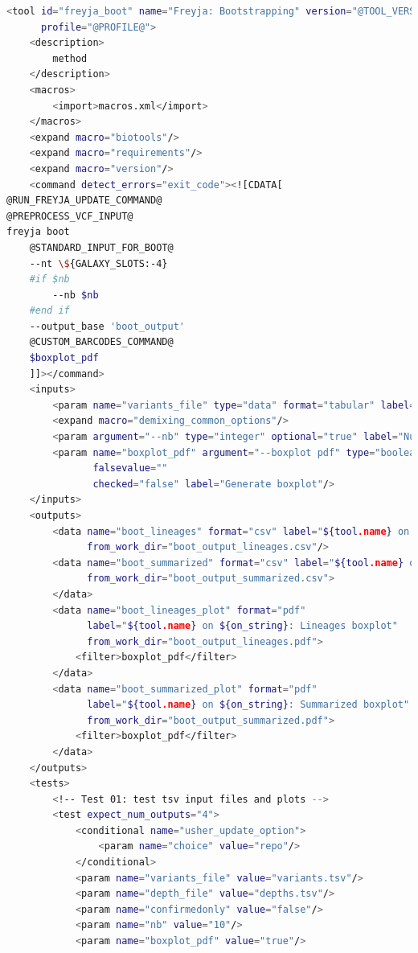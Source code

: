 \begin{lstlisting}[language=bash, caption=tool wrapper for Freyja: Bootstrapping method, label=list:methods:wrapper-freyja-boot]
<tool id="freyja_boot" name="Freyja: Bootstrapping" version="@TOOL_VERSION@+galaxy@VERSION_SUFFIX@"
      profile="@PROFILE@">
    <description>
        method
    </description>
    <macros>
        <import>macros.xml</import>
    </macros>
    <expand macro="biotools"/>
    <expand macro="requirements"/>
    <expand macro="version"/>
    <command detect_errors="exit_code"><![CDATA[
@RUN_FREYJA_UPDATE_COMMAND@
@PREPROCESS_VCF_INPUT@
freyja boot
    @STANDARD_INPUT_FOR_BOOT@
    --nt \${GALAXY_SLOTS:-4}
    #if $nb
        --nb $nb
    #end if
    --output_base 'boot_output'
    @CUSTOM_BARCODES_COMMAND@
    $boxplot_pdf
    ]]></command>
    <inputs>
        <param name="variants_file" type="data" format="tabular" label="Variants file"/>
        <expand macro="demixing_common_options"/>
        <param argument="--nb" type="integer" optional="true" label="Number of bootstraps"/>
        <param name="boxplot_pdf" argument="--boxplot pdf" type="boolean" truevalue="--boxplot pdf"
               falsevalue=""
               checked="false" label="Generate boxplot"/>
    </inputs>
    <outputs>
        <data name="boot_lineages" format="csv" label="${tool.name} on ${on_string}: Lineages"
              from_work_dir="boot_output_lineages.csv"/>
        <data name="boot_summarized" format="csv" label="${tool.name} on ${on_string}: Summarized"
              from_work_dir="boot_output_summarized.csv">
        </data>
        <data name="boot_lineages_plot" format="pdf"
              label="${tool.name} on ${on_string}: Lineages boxplot"
              from_work_dir="boot_output_lineages.pdf">
            <filter>boxplot_pdf</filter>
        </data>
        <data name="boot_summarized_plot" format="pdf"
              label="${tool.name} on ${on_string}: Summarized boxplot"
              from_work_dir="boot_output_summarized.pdf">
            <filter>boxplot_pdf</filter>
        </data>
    </outputs>
    <tests>
        <!-- Test 01: test tsv input files and plots -->
        <test expect_num_outputs="4">
            <conditional name="usher_update_option">
                <param name="choice" value="repo"/>
            </conditional>
            <param name="variants_file" value="variants.tsv"/>
            <param name="depth_file" value="depths.tsv"/>
            <param name="confirmedonly" value="false"/>
            <param name="nb" value="10"/>
            <param name="boxplot_pdf" value="true"/>

\end{lstlisting}
